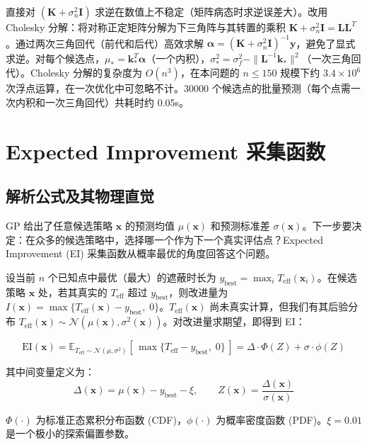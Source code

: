 \documentclass[12pt,a4paper]{ctexart}
\newcommand{\Teff}{T_{\text{eff}}}
\newcommand{\EI}{\mathrm{EI}}
\newcommand{\N}{\mathcal{N}}
\newcommand{\y}{\mathbf{y}}
\newcommand{\K}{\mathbf{K}}
\newcommand{\kstar}{\mathbf{k}_*}
\newcommand{\LS}{\mathbf{L}}
\newcommand{\alphavec}{\boldsymbol{\alpha}}
\begin{document}
直接对 $(\K + \sigma_n^2 \mathbf{I})$ 求逆在数值上不稳定（矩阵病态时求逆误差大）。改用 Cholesky 分解：将对称正定矩阵分解为下三角阵与其转置的乘积 $\K + \sigma_n^2\mathbf{I} = \LS\LS^T$。通过两次三角回代（前代和后代）高效求解 $\alphavec = (\K + \sigma_n^2\mathbf{I})^{-1}\y$，避免了显式求逆。对每个候选点，$\mu_* = \kstar^T \alphavec$（一个内积），$\sigma^2_* = \sigma_f^2 - \|\LS^{-1}\kstar\|^2$（一次三角回代）。Cholesky 分解的复杂度为 $O(n^3)$，在本问题的 $n \leq 150$ 规模下约 $3.4 \times 10^6$ 次浮点运算，在一次优化中可忽略不计。30000 个候选点的批量预测（每个点需一次内积和一次三角回代）共耗时约 0.05s。

\section{Expected Improvement 采集函数}

\subsection{解析公式及其物理直觉}

GP 给出了任意候选策略 $\mathbf{x}$ 的预测均值 $\mu(\mathbf{x})$ 和预测标准差 $\sigma(\mathbf{x})$。下一步要决定：在众多的候选策略中，选择哪一个作为下一个真实评估点？Expected Improvement (EI) 采集函数从概率最优的角度回答这个问题。

设当前 $n$ 个已知点中最优（最大）的遮蔽时长为 $y_{\text{best}} = \max_i \Teff(\mathbf{x}_i)$。在候选策略 $\mathbf{x}$ 处，若其真实的 $\Teff$ 超过 $y_{\text{best}}$，则改进量为 $I(\mathbf{x}) = \max\{\Teff(\mathbf{x}) - y_{\text{best}},\; 0\}$。$\Teff(\mathbf{x})$ 尚未真实计算，但我们有其后验分布 $\Teff(\mathbf{x}) \sim \N(\mu(\mathbf{x}), \sigma^2(\mathbf{x}))$。对改进量求期望，即得到 EI：

\begin{equation}
\boxed{\EI(\mathbf{x}) = \mathbb{E}_{\Teff \sim \N(\mu, \sigma^2)}\!\left[\,\max\{\Teff - y_{\text{best}},\; 0\}\,\right] = \Delta \cdot \Phi(Z) + \sigma \cdot \phi(Z)}
\end{equation}

其中间变量定义为：
\begin{equation}
\Delta(\mathbf{x}) = \mu(\mathbf{x}) - y_{\text{best}} - \xi, \qquad
Z(\mathbf{x}) = \frac{\Delta(\mathbf{x})}{\sigma(\mathbf{x})}
\end{equation}

$\Phi(\cdot)$ 为标准正态累积分布函数 (CDF)，$\phi(\cdot)$ 为概率密度函数 (PDF)。$\xi = 0.01$ 是一个极小的探索偏置参数。
\end{document}
